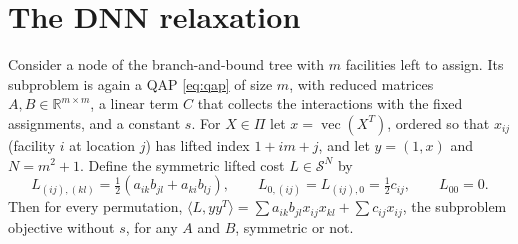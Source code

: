 \documentclass[11pt]{article}
\theoremstyle{remark}
\newcommand{\R}{\mathbb{R}}
\newcommand{\Sym}{\mathcal{S}}
\newcommand{\vecop}{\operatorname{vec}}
\newcommand{\inner}[2]{\langle #1, #2\rangle}
\begin{document}
\section{The DNN relaxation}\label{sec:dnn}

Consider a node of the branch-and-bound tree with $m$ facilities left to assign.
Its subproblem is again a QAP \eqref{eq:qap} of size $m$, with reduced matrices
$A, B \in \R^{m\times m}$, a linear term $C$ that collects the interactions with the
fixed assignments, and a constant $s$. For $X\in\Pi$ let $x = \vecop(X^T)$, ordered
so that $x_{ij}$ (facility $i$ at location $j$) has lifted index $1 + im + j$, and
let $y = (1, x)$ and $N = m^2+1$. Define the symmetric lifted cost $L\in\Sym^N$ by
\begin{equation}\label{eq:L}
  L_{(ij),(kl)} = \tfrac12(a_{ik}b_{jl} + a_{ki}b_{lj}), \qquad
  L_{0,(ij)} = L_{(ij),0} = \tfrac12 c_{ij}, \qquad L_{00} = 0.
\end{equation}
Then for every permutation, $\inner{L}{yy^T} = \sum a_{ik}b_{jl}x_{ij}x_{kl} +
\sum c_{ij}x_{ij}$, the subproblem objective without $s$, for any $A$ and $B$,
symmetric or not.
\end{document}
